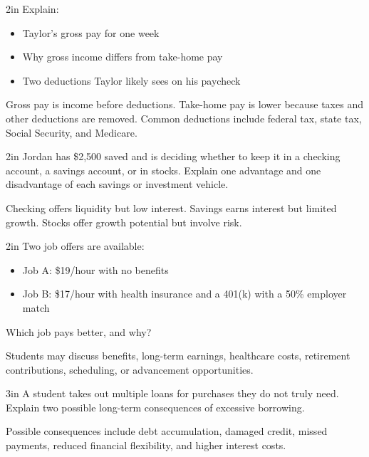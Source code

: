 \documentclass[12pt]{exam}
\begin{document}
\begin{questions}
\begin{shortanswer}[10]{2in}
		Explain:
		\begin{itemize}
			\item Taylor's gross pay for one week
			\item Why gross income differs from take-home pay
			\item Two deductions Taylor likely sees on his paycheck
		\end{itemize}
	\end{shortanswer}
	\begin{solution}
		Gross pay is income before deductions. Take-home pay is lower because taxes and other deductions are removed. Common deductions include federal tax, state tax, Social Security, and Medicare.
	\end{solution}
	
	\begin{shortanswer}[10]{2in}
		Jordan has \$2,500 saved and is deciding whether to keep it in a checking account, a savings account, or in stocks.
		Explain one advantage and one disadvantage of each savings or investment vehicle.
	\end{shortanswer}
	\begin{solution}
		Checking offers liquidity but low interest. Savings earns interest but limited growth. Stocks offer growth potential but involve risk.
	\end{solution}
	
	\begin{shortanswer}[10]{2in}
		Two job offers are available:
		\begin{itemize}
			\item Job A: \$19/hour with no benefits
			\item Job B: \$17/hour with health insurance and a 401(k) with a 50\% employer match
		\end{itemize}
		Which job pays better, and why?
	\end{shortanswer}
	\begin{solution}
		Students may discuss benefits, long-term earnings, healthcare costs, retirement contributions, scheduling, or advancement opportunities.
	\end{solution}
	
	\begin{shortanswer}[10]{3in}
		A student takes out multiple loans for purchases they do not truly need.
		Explain two possible long-term consequences of excessive borrowing.
	\end{shortanswer}
	\begin{solution}
		Possible consequences include debt accumulation, damaged credit, missed payments, reduced financial flexibility, and higher interest costs.
	\end{solution}
	

\end{questions}
\end{document}
